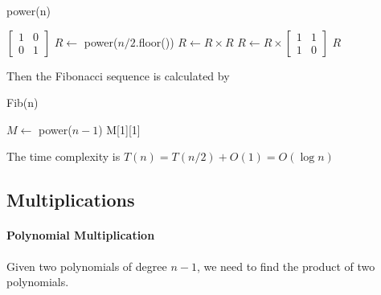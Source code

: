                 \begin{algorithm}[H]
                    \caption{power(n)}
                    \begin{algorithmic}[1]
                            \State \Return $\begin{bmatrix}
                                1 & 0 \\ 0 & 1
                        \end{bmatrix}$
                        \EndIf
                        \State $R \gets$ power($n/2$.floor())
                        \State $R \gets R \times R$
                            \State $R \gets R \times \begin{bmatrix}
                                1 & 1 \\ 1 & 0
                            \end{bmatrix}$
                        \EndIf
                        \State \Return $R$
                    \end{algorithmic}
                \end{algorithm}

                Then the Fibonacci sequence is calculated by

                \begin{algorithm}[H]
                    \caption{Fib(n)}
                    \begin{algorithmic}[1]
                            \State {}
                        \EndIf
                        \State $M \gets $ power($n - 1$)
                        \State \Return M[1][1]
                    \end{algorithmic}
                \end{algorithm}

                The time complexity is $T(n) = T(n/2) + O(1) = O(\log n)$

        \subsection{Multiplications}
            \paragraph{Polynomial Multiplication}
                Given two polynomials of degree $n - 1$, we need to find the product of two polynomials.

